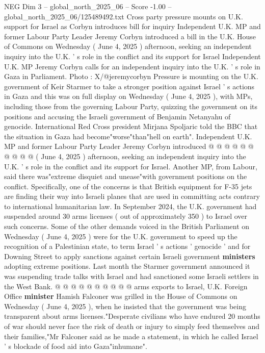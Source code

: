 \begin{textsample}{NEG Dim 3 – global\_north\_2025\_06 – Score -1.00 – global\_north\_2025\_06/125489492.txt}  \label{ex:f3_neg_357}
Cross party pressure mounts on U.K. support for Israel as Corbyn introduces bill for inquiry Independent U.K.
MP and former Labour Party Leader Jeremy Corbyn introduced a bill in the U.K.
House of Commons on Wednesday ( June 4, 2025 ) afternoon, seeking an independent inquiry into the U.K. ' s role in the conflict and its support for Israel Independent U.K.
MP Jeremy Corbyn calls for an independent inquiry into the U.K. ' s role in Gaza in Parliament.
Photo : X/@jeremycorbyn Pressure is mounting on the U.K. government of Keir Starmer to take a stronger position against Israel ' s actions in Gaza and this was on full display on Wednesday ( June 4, 2025 ), with MPs, including those from the governing Labour Party, quizzing the government on its positions and accusing the Israeli government of Benjamin Netanyahu of genocide.
International Red Cross president Mirjana Spoljaric told the BBC that the situation in Gaza had become"worse"than"hell on earth".
Independent U.K.
MP and former Labour Party Leader Jeremy Corbyn introduced @ @ @ @ @ @ @ @ @ @ ( June 4, 2025 ) afternoon, seeking an independent inquiry into the U.K. ' s role in the conflict and its support for Israel.
Another MP, from Labour, said there was"extreme disquiet and unease"with government positions on the conflict.
Specifically, one of the concerns is that British equipment for F-35 jets are finding their way into Israeli planes that are used in committing acts contrary to international humanitarian law.
In September 2024, the U.K. government had suspended around 30 arms licenses ( out of approximately 350 ) to Israel over such concerns.
Some of the other demands voiced in the British Parliament on Wednesday ( June 4, 2025 ) were for the U.K. government to speed up the recognition of a Palestinian state, to term Israel ' s actions ' genocide ' and for Downing Street to apply sanctions against certain Israeli government \textbf{ministers} adopting extreme positions.
Last month the Starmer government announced it was suspending trade talks with Israel and had sanctioned some Israeli settlers in the West Bank. @ @ @ @ @ @ @ @ @ @ arms exports to Israel, U.K.
Foreign Office \textbf{minister} Hamish Falconer was grilled in the House of Commons on Wednesday ( June 4, 2025 ), when he insisted that the government was being transparent about arms licenses."Desperate civilians who have endured 20 months of war should never face the risk of death or injury to simply feed themselves and their families,"Mr Falconer said as he made a statement, in which he called Israel ' s blockade of food aid into Gaza"inhumane".

\end{textsample}
